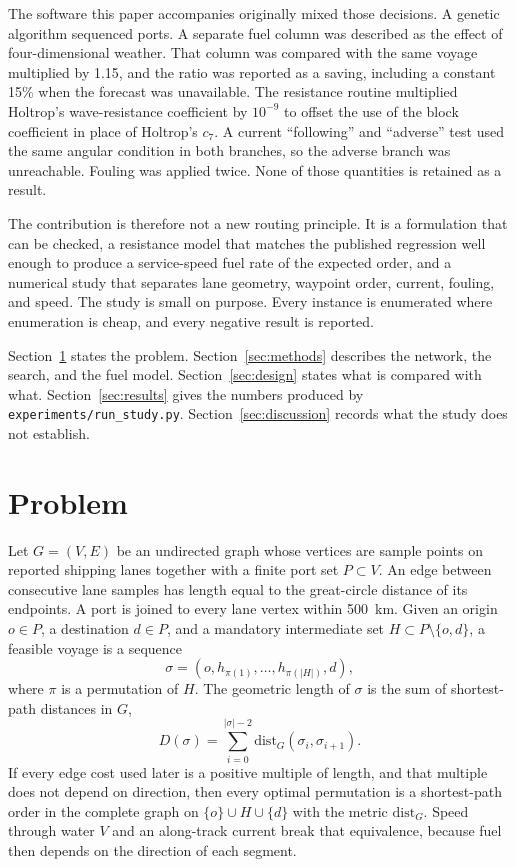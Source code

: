 \documentclass[11pt]{article}
\begin{document}
The software this paper accompanies originally mixed those decisions.
A genetic algorithm sequenced ports.
A separate fuel column was described as the effect of four-dimensional weather.
That column was compared with the same voyage multiplied by 1.15, and the ratio was reported as a saving, including a constant 15\% when the forecast was unavailable.
The resistance routine multiplied Holtrop's wave-resistance coefficient by \(10^{-9}\) to offset the use of the block coefficient in place of Holtrop's \(c_7\).
A current ``following'' and ``adverse'' test used the same angular condition in both branches, so the adverse branch was unreachable.
Fouling was applied twice.
None of those quantities is retained as a result.

The contribution is therefore not a new routing principle.
It is a formulation that can be checked, a resistance model that matches the published regression well enough to produce a service-speed fuel rate of the expected order, and a numerical study that separates lane geometry, waypoint order, current, fouling, and speed.
The study is small on purpose.
Every instance is enumerated where enumeration is cheap, and every negative result is reported.

Section~\ref{sec:problem} states the problem.
Section~\ref{sec:methods} describes the network, the search, and the fuel model.
Section~\ref{sec:design} states what is compared with what.
Section~\ref{sec:results} gives the numbers produced by \texttt{experiments/run\_study.py}.
Section~\ref{sec:discussion} records what the study does not establish.

\section{Problem}
\label{sec:problem}

Let \(G=(V,E)\) be an undirected graph whose vertices are sample points on reported shipping lanes together with a finite port set \(P\subset V\).
An edge between consecutive lane samples has length equal to the great-circle distance of its endpoints.
A port is joined to every lane vertex within 500~km.
Given an origin \(o\in P\), a destination \(d\in P\), and a mandatory intermediate set \(H\subset P\setminus\{o,d\}\), a feasible voyage is a sequence
\begin{equation}
\sigma = (o, h_{\pi(1)}, \ldots, h_{\pi(|H|)}, d),
\end{equation}
where \(\pi\) is a permutation of \(H\).
The geometric length of \(\sigma\) is the sum of shortest-path distances in \(G\),
\begin{equation}
D(\sigma) = \sum_{i=0}^{|\sigma|-2} \mathrm{dist}_G(\sigma_i, \sigma_{i+1}).
\end{equation}
If every edge cost used later is a positive multiple of length, and that multiple does not depend on direction, then every optimal permutation is a shortest-path order in the complete graph on \(\{o\}\cup H\cup\{d\}\) with the metric \(\mathrm{dist}_G\).
Speed through water \(V\) and an along-track current break that equivalence, because fuel then depends on the direction of each segment.
\end{document}
